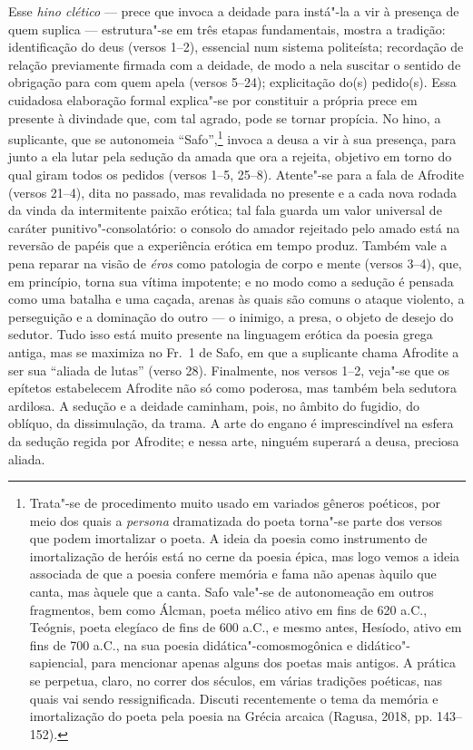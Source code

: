 {\small Esse \textit{hino clético} --- prece que invoca a deidade para instá"-la a vir à
presença de quem suplica --- estrutura"-se em três etapas
fundamentais, mostra a tradição: identificação do deus (versos 1--2), essencial
num sistema politeísta; recordação de relação previamente firmada com a
deidade, de modo a nela suscitar o sentido de obrigação para com quem apela
(versos 5--24); explicitação do(s) pedido(s). Essa cuidadosa elaboração
formal explica"-se por constituir a própria prece em presente à divindade que, com
tal agrado, pode se tornar propícia. No hino, a suplicante, que se autonomeia
“Safo”,\footnote{Trata"-se de procedimento muito usado em variados gêneros poéticos, por meio dos quais a \textit{persona} dramatizada do poeta torna"-se parte dos versos que podem imortalizar o poeta. A ideia da poesia como instrumento de imortalização de heróis está no cerne da poesia épica, mas logo vemos a ideia associada de que a poesia confere memória e fama não apenas àquilo que canta, mas àquele que a canta. Safo vale"-se de autonomeação em outros fragmentos, bem como Álcman, poeta mélico ativo em fins de 620 a.C., Teógnis, poeta elegíaco de fins de 600 a.C., e mesmo antes, Hesíodo, ativo em fins de 700 a.C., na sua poesia didática"-comosmogônica e didático"-sapiencial, para mencionar apenas alguns dos poetas mais antigos. A prática se perpetua, claro, no correr dos séculos, em várias tradições poéticas, nas quais vai sendo ressignificada. Discuti recentemente o tema da memória e imortalização do poeta pela poesia na Grécia arcaica (Ragusa, 2018, pp. 143--152).} invoca a deusa
a vir à sua presença, para junto a ela lutar pela sedução da amada que ora a
rejeita, objetivo em torno do qual giram todos os pedidos (versos 1--5, 25--8).
Atente"-se para a fala de Afrodite (versos 21--4), dita no passado, mas
revalidada no presente e a cada nova rodada da vinda da intermitente paixão
erótica; tal fala guarda um valor universal de caráter punitivo"-consolatório: o
consolo do amador rejeitado pelo amado está na reversão de papéis que a
experiência erótica em tempo produz. Também vale a pena reparar na visão de
\textit{éros} como patologia de corpo e mente (versos 3--4), que, em princípio,
torna sua vítima impotente; e no modo como a sedução é pensada como uma batalha
e uma caçada, arenas às quais são comuns o ataque violento, a perseguição e a
dominação do outro --- o inimigo, a presa, o objeto de desejo do sedutor. Tudo
isso está muito presente na linguagem erótica da poesia grega antiga, mas se
maximiza no Fr.~1 de Safo, em que a suplicante chama Afrodite a ser sua
“aliada de lutas” (verso 28). Finalmente, nos versos 1--2, veja"-se
que os epítetos estabelecem Afrodite não só como poderosa, mas também bela
sedutora ardilosa. A sedução e a deidade caminham, pois, no âmbito do fugidio,
do oblíquo, da dissimulação, da trama. A arte do engano é imprescindível na
esfera da sedução regida por Afrodite; e nessa arte, ninguém superará a deusa,
preciosa aliada.

}
